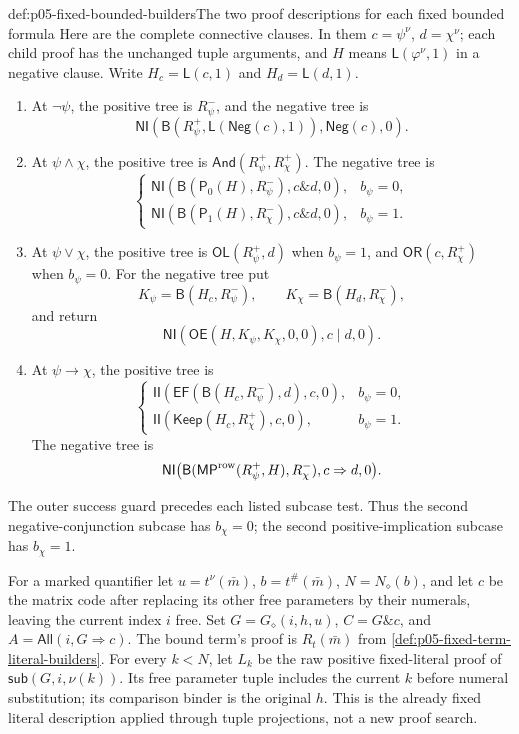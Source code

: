 \begin{hbdefinition}{def:p05-fixed-bounded-builders}{The two proof descriptions for each fixed bounded formula}
Here are the complete connective clauses. In them \(c=\psi^\nu\),
\(d=\chi^\nu\); each child proof has the unchanged tuple arguments,
and \(H\) means \(\mathsf L(\varphi^\nu,1)\) in a negative clause.
Write \(H_c=\mathsf L(c,1)\) and \(H_d=\mathsf L(d,1)\).
\begin{enumerate}
\item At \(\neg\psi\), the positive tree is \(R_\psi^-\), and the
negative tree is
\[
 \mathsf{NI}(\mathsf B(R_\psi^+,\mathsf L(\mathsf{Neg}(c),1)),
                                         \mathsf{Neg}(c),0).
\]
\item At \(\psi\land\chi\), the positive tree is
\(\mathsf{And}(R_\psi^+,R_\chi^+)\). The negative tree is
\[
 \begin{cases}
 \mathsf{NI}(\mathsf B(\mathsf P_0(H),R_\psi^-),c\mathbin{\&}d,0),&b_\psi=0,\\
 \mathsf{NI}(\mathsf B(\mathsf P_1(H),R_\chi^-),c\mathbin{\&}d,0),&b_\psi=1.
 \end{cases}
\]
\item At \(\psi\lor\chi\), the positive tree is
\(\mathsf{OL}(R_\psi^+,d)\) when \(b_\psi=1\), and
\(\mathsf{OR}(c,R_\chi^+)\) when \(b_\psi=0\). For the negative
tree put
\[
 K_\psi=\mathsf B(H_c,R_\psi^-),\qquad
 K_\chi=\mathsf B(H_d,R_\chi^-),
\]
and return
\[
 \mathsf{NI}(\mathsf{OE}(H,K_\psi,K_\chi,0,0),c\mathbin{|}d,0).
\]
\item At \(\psi\to\chi\), the positive tree is
\[
 \begin{cases}
 \mathsf{II}(\mathsf{EF}(\mathsf B(H_c,R_\psi^-),d),c,0),&b_\psi=0,\\
 \mathsf{II}(\mathsf{Keep}(H_c,R_\chi^+),c,0),&b_\psi=1.
 \end{cases}
\]
The negative tree is
\[
 \mathsf{NI}\bigl(
   \mathsf B(\mathsf{MP}^{\rm row}(R_\psi^+,H),R_\chi^-),c\Rightarrow d,0\bigr).
\]
\end{enumerate}
The outer success guard precedes each listed subcase test. Thus the second
negative-conjunction subcase has \(b_\chi=0\); the second
positive-implication subcase has \(b_\chi=1\).

For a marked quantifier let \(u=t^\nu(\bar m)\),
\(b=t^\#(\bar m)\), \(N=N_\diamond(b)\), and let \(c\) be the
matrix code after replacing its other free parameters by their numerals,
leaving the current index \(i\) free. Set
\(G=G_\diamond(i,h,u)\), \(C=G\mathbin{\&}c\), and
\(A=\mathsf{All}(i,G\Rightarrow c)\). The bound term's proof is
\(R_t(\bar m)\) from \cref{def:p05-fixed-term-literal-builders}.
For every \(k<N\), let \(L_k\) be the raw positive fixed-literal
proof of \(\mathsf{sub}(G,i,\nu(k))\). Its free parameter tuple
includes the current \(k\) before numeral substitution; its comparison
binder is the original \(h\). This is the already fixed literal
description applied through tuple projections, not a new proof search.


\end{hbdefinition}
